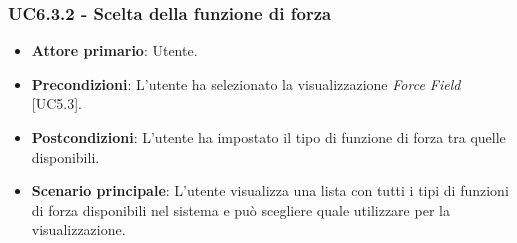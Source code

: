 \subsubsection{UC6.3.2 - Scelta della funzione di forza}
\begin{itemize}
	\item \textbf{Attore primario}: Utente.
	\item \textbf{Precondizioni}: L'utente ha selezionato la visualizzazione \textit{Force Field} [UC5.3].
	\item \textbf{Postcondizioni}: L'utente ha impostato il tipo di funzione di forza tra quelle disponibili.
	
	\item \textbf{Scenario principale}: L'utente visualizza una lista con tutti i tipi di funzioni di forza disponibili nel sistema e può scegliere quale utilizzare per la visualizzazione.
\end{itemize}